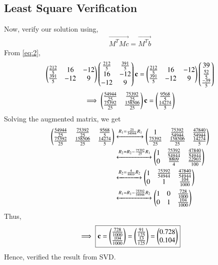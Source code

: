 \documentclass[journal,12pt,twocolumn]{IEEEtran}
\begin{document}
\subsection{Least Square Verification}
Now, verify our solution using,
\begin{align}
	 \vec{M^TMc} = \vec{M^Tb} 
\end{align}
From \eqref{eq:2},
\begin{align}
\begin{pmatrix}\frac{212}{5} & 16 & -12 \\ \frac{391}{5} & -12 & 9 \end{pmatrix} \begin{pmatrix}\frac{212}{5} & \frac{391}{5} \\ 16 & -12 \\ -12 & 9\end{pmatrix} \mathbf{c}= \begin{pmatrix}\frac{212}{5} & 16 & -12 \\ \frac{391}{5} & -12 & 9 \end{pmatrix} \begin{pmatrix}39 \\ \frac{52}{5}\\ \frac{-39}{5}\end{pmatrix}
\end{align}
\begin{align}
    \implies \begin{pmatrix}\frac{54944}{25} & \frac{75392}{25} \\ \frac{75392}{25} & \frac{158506}{25} \end{pmatrix} \mathbf{c}= \begin{pmatrix}\frac{9568}{5} \\ \frac{14274}{5} \end{pmatrix}
\end{align}
Solving the augmented matrix, we get
\begin{align}
\begin{pmatrix}\frac{54944}{25}&\frac{75392}{25}&\frac{9568}{5}\\\frac{75392}{25}&\frac{158506}{25}&\frac{14274}{5}\end{pmatrix} &\xleftrightarrow{R_1=\frac{25}{54944}R_1}\begin{pmatrix}1&\frac{75392}{54944}&\frac{47840}{54944}\\\frac{75392}{25}&\frac{158506}{25}&\frac{14274}{5}\end{pmatrix}\\
&\xleftrightarrow{R_2=R_2-\frac{75392}{25}R_1}\begin{pmatrix}1&\frac{75392}{54944}&\frac{47840}{54944}\\0&\frac{8809}{4}&\frac{22903}{100}\end{pmatrix}\\
&\xleftrightarrow{R_2=\frac{4}{8809}R_2}\begin{pmatrix}1&\frac{75392}{54944}&\frac{47840}{54944}\\0&1&\frac{104}{1000}\end{pmatrix}\\
&\xleftrightarrow{R_1=R_1-\frac{75392}{54944}R_2}\begin{pmatrix}1&0&\frac{728}{1000}\\0&1&\frac{104}{1000}\end{pmatrix}
\end{align}
Thus,
\begin{align}
    \implies \boxed{\mathbf{c}= \begin{pmatrix}\frac{728}{1000} \\ \frac{104}{1000} \end{pmatrix}= \begin{pmatrix}\frac{91}{125}\\ \frac{13}{125}\end{pmatrix}= \begin{pmatrix}0.728 \\ 0.104\end{pmatrix}}
\end{align}
Hence, verified the result from SVD.
\end{document}
